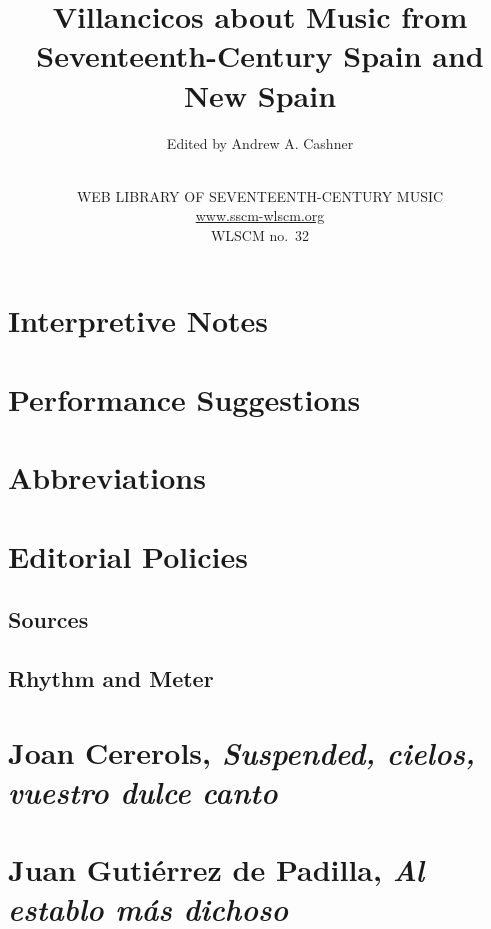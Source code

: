 \documentclass[12pt,oneside]{book}
\title{Villancicos about Music from 
Seventeenth-Century Spain and New Spain}
\author{Edited by Andrew A. Cashner}
\date{%
    \number\year\\[2ex]
    {\footcolor
    WEB LIBRARY OF SEVENTEENTH-CENTURY MUSIC\\ 
    \url{www.sscm-wlscm.org}\\ 
    WLSCM no.~32}
}
\begin{document}
\frontmatter

\maketitle

\tableofcontents

\lipsum[1]

\section{Interpretive Notes}
\lipsum[1]

\section{Performance Suggestions}
\lipsum[1]


\section{Abbreviations}
\lipsum[1]

\section{Editorial Policies}
\lipsum[1]

\subsection{Sources}
\lipsum[1]

\subsection{Rhythm and Meter}
\lipsum[1]


\section{Joan Cererols, \emph{Suspended, cielos, vuestro dulce canto}}
\lipsum

\section{Juan Gutiérrez de Padilla, \emph{Al establo más dichoso}}
\lipsum

\end{document}
